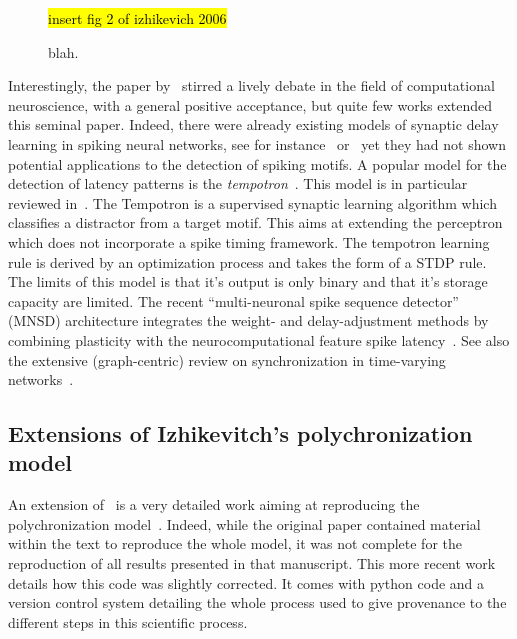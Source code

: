 \documentclass[brainsci, %
               review,submit,pdftex,moreauthors%
               ]{Definitions/mdpi}
\newcommand{\note}[1]{{\sethlcolor{yellow}\hl{#1}}}
\begin{document}
\begin{figure}
\centering
\note{insert fig 2 of izhikevich 2006}
\caption{blah.}\label{fig:PG}
\end{figure}

Interestingly, the paper by~\citet{izhikevich_polychronization_2006} stirred a lively debate in the field of computational neuroscience, with a general positive acceptance, but quite few works extended this seminal paper.
Indeed, there were already existing models of synaptic delay learning in spiking neural networks, see for instance~\citep{huning_synaptic_1998} or~\citep{eurich_dynamics_1999} yet they had not shown potential applications to the detection of spiking motifs. A popular model for the detection of latency patterns is the \emph{tempotron}~\citep{gutig_tempotron_2006}. This model is in particular reviewed in~\citep{gutig_spike_2014}. The Tempotron is a supervised synaptic learning algorithm which classifies a distractor from a target motif. This aims at extending the perceptron which does not incorporate a spike timing framework. The tempotron learning rule is derived by an optimization process and takes the form of a STDP rule.  The limits of this model is that it's output is only binary and that it's storage capacity are limited. The recent ``multi-neuronal spike sequence detector'' (MNSD) architecture integrates the weight- and delay-adjustment methods by combining plasticity with the neurocomputational feature spike latency~\citep{susi_nmnsd-spiking_2021}. See also the extensive (graph-centric) review on synchronization in time-varying networks~\citep{ghosh_synchronized_2022}.


\subsection{Extensions of Izhikevitch's polychronization model}
%
An extension of~\citep{izhikevich_polychronization_2006} is a very detailed work aiming at reproducing the polychronization model~\citep{pauli_reproducing_2018}. Indeed, while the original paper contained material within the text to reproduce the whole model, it was not complete for the reproduction of all results presented in that manuscript. This more recent work details how this code was slightly corrected. It comes with python code and a version control system detailing the whole process used to give provenance to the different steps in this scientific process.
\end{document}
